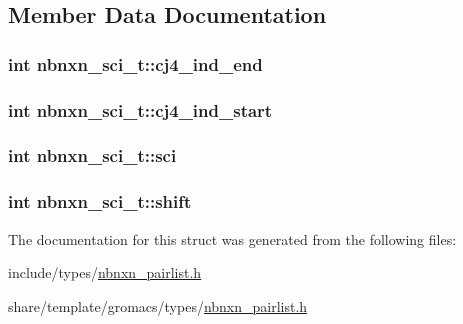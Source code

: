 \subsection{\-Member \-Data \-Documentation}
\hypertarget{structnbnxn__sci__t_a4dafffcb490ffb9ff27cb0ebbabcde81}{
\subsubsection[{cj4\-\_\-ind\-\_\-end}]{\setlength{\rightskip}{0pt plus 5cm}int {\bf nbnxn\-\_\-sci\-\_\-t\-::cj4\-\_\-ind\-\_\-end}}}\label{structnbnxn__sci__t_a4dafffcb490ffb9ff27cb0ebbabcde81}
\hypertarget{structnbnxn__sci__t_ae80b28fc308472768828c2b24383aa6c}{
\subsubsection[{cj4\-\_\-ind\-\_\-start}]{\setlength{\rightskip}{0pt plus 5cm}int {\bf nbnxn\-\_\-sci\-\_\-t\-::cj4\-\_\-ind\-\_\-start}}}\label{structnbnxn__sci__t_ae80b28fc308472768828c2b24383aa6c}
\hypertarget{structnbnxn__sci__t_aa2075cfcd1414a72f7e477b57cdad4e4}{
\subsubsection[{sci}]{\setlength{\rightskip}{0pt plus 5cm}int {\bf nbnxn\-\_\-sci\-\_\-t\-::sci}}}\label{structnbnxn__sci__t_aa2075cfcd1414a72f7e477b57cdad4e4}
\hypertarget{structnbnxn__sci__t_a675754940450d119942436a3a7827abf}{
\subsubsection[{shift}]{\setlength{\rightskip}{0pt plus 5cm}int {\bf nbnxn\-\_\-sci\-\_\-t\-::shift}}}\label{structnbnxn__sci__t_a675754940450d119942436a3a7827abf}


\-The documentation for this struct was generated from the following files\-:\begin{DoxyCompactItemize}
\item 
include/types/\hyperlink{include_2types_2nbnxn__pairlist_8h}{nbnxn\-\_\-pairlist.\-h}\item 
share/template/gromacs/types/\hyperlink{share_2template_2gromacs_2types_2nbnxn__pairlist_8h}{nbnxn\-\_\-pairlist.\-h}\end{DoxyCompactItemize}
